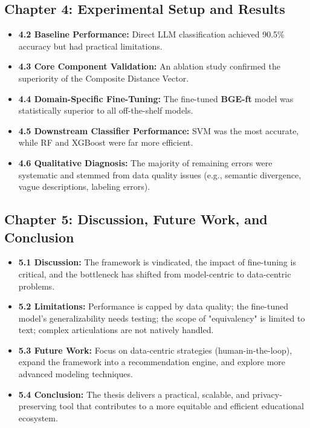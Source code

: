\documentclass[11pt]{article}
\begin{document}
\subsection*{Chapter 4: Experimental Setup and Results}
\begin{itemize}
    \item \textbf{4.2 Baseline Performance:} Direct LLM classification achieved 90.5\% accuracy but had practical limitations.
    \item \textbf{4.3 Core Component Validation:} An ablation study confirmed the superiority of the Composite Distance Vector.
    \item \textbf{4.4 Domain-Specific Fine-Tuning:} The fine-tuned \textbf{BGE-ft} model was statistically superior to all off-the-shelf models.
    \item \textbf{4.5 Downstream Classifier Performance:} SVM was the most accurate, while RF and XGBoost were far more efficient.
    \item \textbf{4.6 Qualitative Diagnosis:} The majority of remaining errors were systematic and stemmed from data quality issues (e.g., semantic divergence, vague descriptions, labeling errors).
\end{itemize}

\subsection*{Chapter 5: Discussion, Future Work, and Conclusion}
\begin{itemize}
    \item \textbf{5.1 Discussion:} The framework is vindicated, the impact of fine-tuning is critical, and the bottleneck has shifted from model-centric to data-centric problems.
    \item \textbf{5.2 Limitations:} Performance is capped by data quality; the fine-tuned model's generalizability needs testing; the scope of "equivalency" is limited to text; complex articulations are not natively handled.
    \item \textbf{5.3 Future Work:} Focus on data-centric strategies (human-in-the-loop), expand the framework into a recommendation engine, and explore more advanced modeling techniques.
    \item \textbf{5.4 Conclusion:} The thesis delivers a practical, scalable, and privacy-preserving tool that contributes to a more equitable and efficient educational ecosystem.
\end{itemize}
\end{document}
